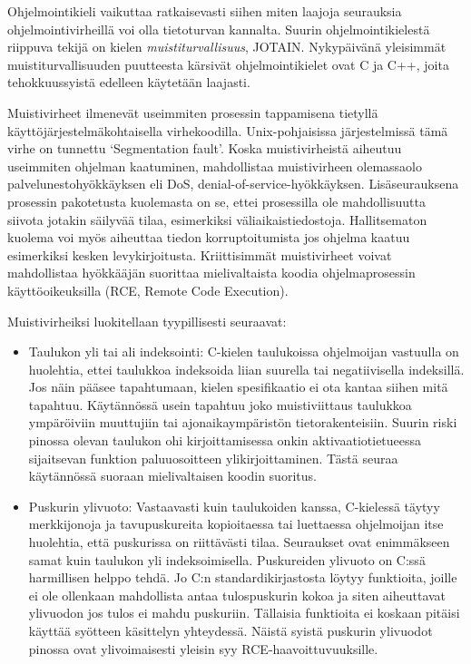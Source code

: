 Ohjelmointikieli vaikuttaa ratkaisevasti siihen miten laajoja seurauksia ohjelmointivirheillä voi olla tietoturvan kannalta.
Suurin ohjelmointikielestä riippuva tekijä on kielen \emph{muistiturvallisuus}, JOTAIN.
Nykypäivänä yleisimmät muistiturvallisuuden puutteesta kärsivät ohjelmointikielet ovat C ja C++,
joita tehokkuussyistä edelleen käytetään laajasti.

Muistivirheet ilmenevät useimmiten prosessin tappamisena tietyllä
käyt\-tö\-jär\-jes\-tel\-mä\-koh\-tai\-sel\-la virhekoodilla.
Unix-pohjaisissa järjestelmissä tämä virhe on tunnettu `Segmentation fault'.
Koska muistivirheistä aiheutuu useimmiten ohjelman kaatuminen,
mahdollistaa muistivirheen olemassaolo palvelunestohyökkäyksen eli DoS, denial-of-service-hyökkäyksen.
Lisäseurauksena prosessin pakotetusta kuolemasta on se,
ettei prosessilla ole mahdollisuutta siivota jotakin säilyvää tilaa,
esimerkiksi väliaikaistiedostoja.
Hallitsematon kuolema voi myös aiheuttaa tiedon korruptoitumista jos ohjelma kaatuu esimerkiksi kesken levykirjoitusta.
Kriittisimmät muistivirheet voivat mahdollistaa hyökkääjän suorittaa mielivaltaista koodia ohjelmaprosessin käyttöoikeuksilla (RCE, Remote Code Execution).

Muistivirheiksi luokitellaan tyypillisesti seuraavat:

\begin{itemize}
    \item Taulukon yli tai ali indeksointi: C-kielen taulukoissa ohjelmoijan vastuulla on huolehtia,
          ettei taulukkoa indeksoida liian suurella tai negatiivisella indeksillä.
          Jos näin pääsee tapahtumaan, kielen spesifikaatio ei ota kantaa siihen mitä tapahtuu.
          Käytännössä usein tapahtuu joko muistiviittaus taulukkoa ympäröiviin muuttujiin tai
            ajonaikaympäristön tietorakenteisiin.
          Suurin riski pinossa olevan taulukon ohi kirjoittamisessa onkin aktivaatiotietueessa
            sijaitsevan funktion paluuosoitteen ylikirjoittaminen.
          Tästä seuraa käytännössä suoraan mielivaltaisen koodin suoritus.
    \item Puskurin ylivuoto: Vastaavasti kuin taulukoiden kanssa,
          C-kielessä täytyy merkkijonoja ja tavupuskureita kopioitaessa tai luettaessa
             ohjelmoijan itse huolehtia, että puskurissa on riittävästi tilaa.
          Seuraukset ovat enimmäkseen samat kuin taulukon yli indeksoimisella.
          Puskureiden ylivuoto on C:ssä harmillisen helppo tehdä.
          Jo C:n standardikirjastosta löytyy funktioita,
          joille ei ole ollenkaan mahdollista antaa tulospuskurin kokoa ja siten aiheuttavat
          ylivuodon jos tulos ei mahdu puskuriin.
          Tällaisia funktioita ei koskaan pitäisi käyttää syötteen käsittelyn yhteydessä.
          Näistä syistä puskurin ylivuodot pinossa ovat ylivoimaisesti yleisin syy RCE-haavoittuvuuksille.
\end{itemize}

